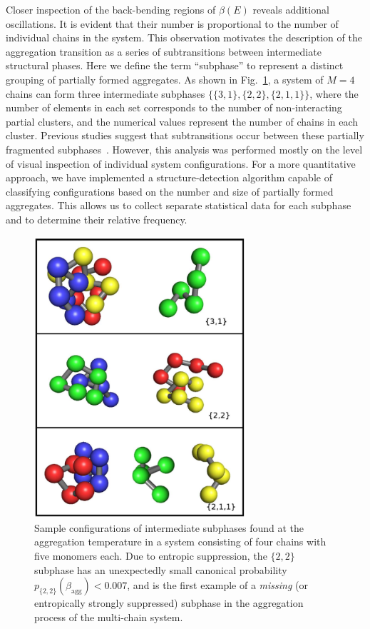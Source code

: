 \documentclass[12pt]{report}
\begin{document}
%
Closer inspection of the back-bending regions of $\beta (E)$ reveals additional oscillations. It is evident that their number is proportional to the number of individual chains in the system. This observation motivates the description of the aggregation transition as a series of subtransitions between intermediate structural phases. Here we define the term ``subphase'' to represent a distinct grouping of partially formed aggregates. As shown in Fig.~\ref{fig:agg_structures}, a system of $M =4$ chains can form three intermediate subphases $\{\{3,1\},\{2,2\},\{2,1,1\}\}$, where the number of elements in each set corresponds to the number of non-interacting partial clusters, and the numerical values represent the number of chains in each cluster. Previous studies suggest that subtransitions occur between these partially fragmented subphases~\cite{jbj1,Junghans2008,Junghans2009,Junghans2011}. However, this analysis was performed mostly on the level of visual inspection of individual system configurations. For a more quantitative approach, we have implemented a structure-detection algorithm capable of classifying configurations based on the number and size of partially formed aggregates. This allows us to collect separate statistical data for each subphase and to determine their relative frequency.
%
\begin{figure}
\center
\includegraphics[width = 0.7\textwidth]{chapter7Figs/configurations.eps}
\vspace{3mm}
\caption{\label{fig:agg_structures} Sample configurations of intermediate subphases found at the aggregation temperature in a system consisting of four chains with five monomers each. Due to entropic suppression, the $\{2,2\}$ subphase has an unexpectedly small canonical probability $p_{\{2,2\}}(\beta_{\mathrm{agg}}) < 0.007$, and is the first example of a \textit{missing} (or entropically strongly suppressed) subphase in the aggregation process of the multi-chain system.}
\end{figure}
%
\end{document}
